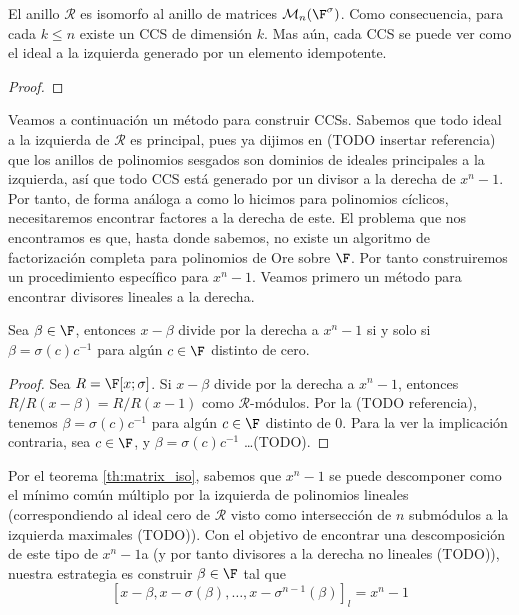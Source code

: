 
\begin{theorem}\label{th:matrix_iso}
    El anillo \(\mathcal{R}\) es isomorfo al anillo de matrices \(\mathcal{M}_n(\F^\sigma)\). Como consecuencia, para cada \(k \leq n\) existe un CCS de dimensión \(k\). Mas aún, cada CCS se puede ver como el ideal a la izquierda generado por un elemento idempotente.
\end{theorem}

\begin{proof}

\end{proof}

Veamos a continuación un método para construir CCSs. Sabemos que todo ideal a la izquierda de \(\mathcal{R}\) es principal, pues ya dijimos en (TODO insertar referencia) que los anillos de polinomios sesgados son dominios de ideales principales a la izquierda, así que todo CCS está generado por un divisor a la derecha de \(x^n - 1\). Por tanto, de forma análoga a como lo hicimos para polinomios cíclicos, necesitaremos encontrar factores a la derecha de este. El problema que nos encontramos es que, hasta donde sabemos, no existe un algoritmo de factorización completa para polinomios de Ore sobre \(\F\). Por tanto construiremos un procedimiento específico para \(x^n - 1\). Veamos primero un método para encontrar divisores lineales a la derecha.

\begin{proposition}
\label{prop:x_beta}
    Sea \(\beta \in \F\), entonces  \(x - \beta\) divide por la derecha a  \(x^n -1\) si y solo si  \(\beta = \sigma(c)c^{-1}\) para algún  \(c \in \F\) distinto de cero.
\end{proposition}

\begin{proof}
    Sea \(R = \F[x; \sigma]\). Si \(x - \beta\) divide por la derecha a \(x^n - 1\), entonces \(R/R(x - \beta) = R/R(x-1)\) como \(\mathcal{R}\)-módulos. Por la (TODO referencia), tenemos \(\beta = \sigma(c)c^{-1}\) para algún \(c \in \F\) distinto de 0. Para la ver la implicación contraria, sea  \(c \in \F\), y  \(\beta = \sigma(c)c^{-1}\) \dots (TODO).
\end{proof}

Por el teorema \ref{th:matrix_iso}, sabemos que \(x^n - 1\) se puede descomponer como el mínimo común múltiplo por la izquierda de polinomios lineales (correspondiendo al ideal cero de \(\mathcal{R}\) visto como intersección de \(n\) submódulos a la izquierda maximales (TODO)). Con el objetivo de encontrar una descomposición de este tipo de \(x^n - 1\)a (y por tanto divisores a la derecha no lineales (TODO)), nuestra estrategia es construir \(\beta \in \F\) tal que
\begin{equation}
\label{eq:lclm}
[x - \beta, x - \sigma(\beta), \dots, x - \sigma^{n-1}(\beta)]_l = x^n -1
\end{equation}

